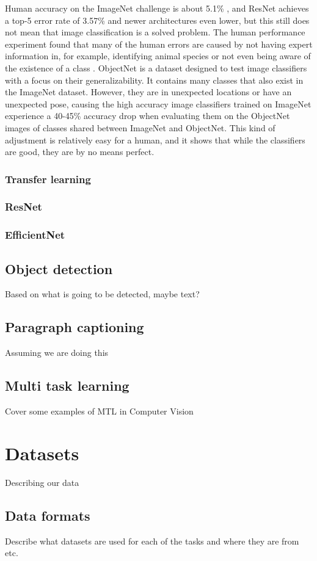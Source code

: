 Human accuracy on the ImageNet challenge is about 5.1\% \citep{imageNet_summary}, and ResNet achieves a top-5 error rate of 3.57\% \citep{resNet} and newer architectures even lower, but this still does not mean that image classification is a solved problem. The human performance experiment found that many of the human errors are caused by not having expert information in, for example, identifying animal species or not even being aware of the existence of a class \citep{imageNet_summary}. ObjectNet \citep{objectNet} is a dataset designed to test image classifiers with a focus on their generalizability. It contains many classes that also exist in the ImageNet dataset. However, they are in unexpected locations or have an unexpected pose, causing the high accuracy image classifiers trained on ImageNet experience a 40-45\% accuracy drop when evaluating them on the ObjectNet images of classes shared between ImageNet and ObjectNet. This kind of adjustment is relatively easy for a human, and it shows that while the classifiers are good, they are by no means perfect.
\subsection{Transfer learning}
\subsection{ResNet}
\subsection{EfficientNet}
\section{Object detection}
Based on what is going to be detected, maybe text?
\section{Paragraph captioning}
Assuming we are doing this
\section{Multi task learning}
Cover some examples of MTL in Computer Vision

\chapter{Datasets}
Describing our data
\section{Data formats}
Describe what datasets are used for each of the tasks and where they are from etc.


